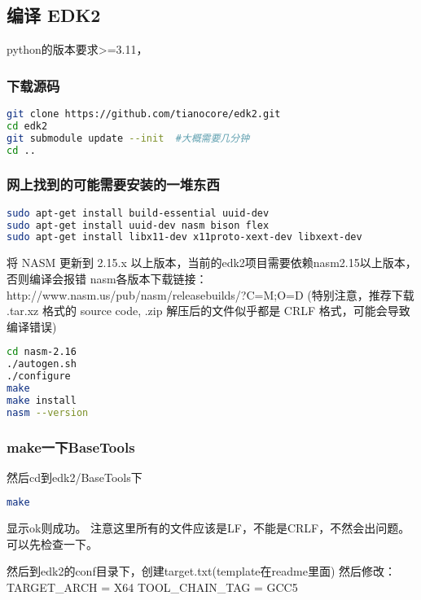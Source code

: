 \subsection{编译 EDK2}

python的版本要求>=3.11，

\subsubsection{下载源码}
\begin{lstlisting}[language=bash]
git clone https://github.com/tianocore/edk2.git
cd edk2
git submodule update --init  #大概需要几分钟
cd ..
\end{lstlisting}

\subsubsection{网上找到的可能需要安装的一堆东西} \label{compile-edk2}

\begin{lstlisting}[language=bash]
sudo apt-get install build-essential uuid-dev
sudo apt-get install uuid-dev nasm bison flex
sudo apt-get install libx11-dev x11proto-xext-dev libxext-dev
\end{lstlisting}

将 NASM 更新到 2.15.x 以上版本，当前的edk2项目需要依赖nasm2.15以上版本，否则编译会报错
nasm各版本下载链接：http://www.nasm.us/pub/nasm/releasebuilds/?C=M;O=D
(特别注意，推荐下载 .tar.xz 格式的 source code, .zip 解压后的文件似乎都是 CRLF 格式，可能会导致编译错误)

\begin{lstlisting}[language=bash]
cd nasm-2.16
./autogen.sh
./configure
make
make install
nasm --version
\end{lstlisting}

\subsubsection{make一下BaseTools}

然后cd到edk2/BaseTools下
\begin{lstlisting}[language=bash]
make
\end{lstlisting}

显示ok则成功。
注意这里所有的文件应该是LF，不能是CRLF，不然会出问题。可以先检查一下。

然后到edk2的conf目录下，创建target.txt(template在readme里面)
然后修改：
TARGET\_ARCH           = X64
TOOL\_CHAIN\_TAG        = GCC5

